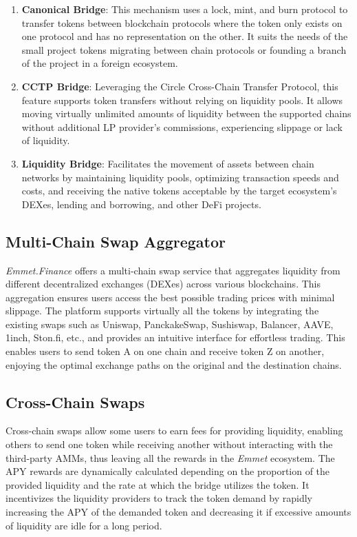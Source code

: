 \documentclass[12pt, a4paper]{article}
\begin{document}
\begin{enumerate}
    \item \textbf{Canonical Bridge}: This mechanism uses a lock, mint, and burn protocol to transfer tokens between blockchain protocols where the token only exists on one protocol and has no representation on the other. It suits the needs of the small project tokens migrating between chain protocols or founding a branch of the project in a foreign ecosystem.
    \item \textbf{CCTP Bridge}: Leveraging the Circle Cross-Chain Transfer Protocol, this feature supports token transfers without relying on liquidity pools. It allows moving virtually unlimited amounts of liquidity between the supported chains without additional LP provider’s commissions, experiencing slippage or lack of liquidity.
    \item \textbf{Liquidity Bridge}: Facilitates the movement of assets between chain networks by maintaining liquidity pools, optimizing transaction speeds and costs, and receiving the native tokens acceptable by the target ecosystem’s DEXes, lending and borrowing, and other DeFi projects.
\end{enumerate}

\subsection{Multi-Chain Swap Aggregator}

\textit{Emmet.Finance} offers a multi-chain swap service that aggregates liquidity from different decentralized exchanges (DEXes) across various blockchains. This aggregation ensures users access the best possible trading prices with minimal slippage. The platform supports virtually all the tokens by integrating the existing swaps such as Uniswap, PanckakeSwap, Sushiswap, Balancer, AAVE, 1inch, Ston.fi, etc., and provides an intuitive interface for effortless trading. This enables users to send token A on one chain and receive token Z on another, enjoying the optimal exchange paths on the original and the destination chains. 

\subsection{Cross-Chain Swaps}

Cross-chain swaps allow some users to earn fees for providing liquidity, enabling others to send one token while receiving another without interacting with the third-party AMMs, thus leaving all the rewards in the \textit{Emmet} ecosystem. The APY rewards are dynamically calculated depending on the proportion of the provided liquidity and the rate at which the bridge utilizes the token. It incentivizes the liquidity providers to track the token demand by rapidly increasing the APY of the demanded token and decreasing it if excessive amounts of liquidity are idle for a long period.
\end{document}

